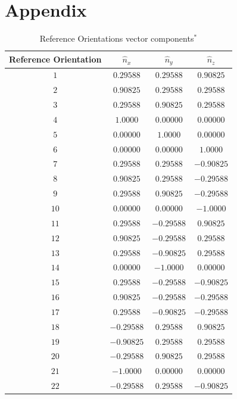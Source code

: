 \documentclass[preprint,3p]{elsarticle}
\begin{document}
 

\newpage

\section*{Appendix}
\label{Appendix 1}
\begin{table}[h]
	\begin{center}
		\caption{\label{tab:n} Reference Orientations vector components$^*$}
		\begin{tabular}{|c|c|c|c|}
			\hline\hline
			Reference Orientation & $\hat{n}_x$ &  $\hat{n}_y$ &  $\hat{n}_z$ \\
			\hline
			$1$ & $ 0.29588$ &  $ 0.29588$ & $ 0.90825$ \\
			$2$ & $ 0.90825$ &  $ 0.29588$ & $ 0.29588$ \\
			$3$ & $ 0.29588$ &  $ 0.90825$ & $ 0.29588$ \\
			$4$ & $1.0000$ &  $0.00000$ & $0.00000$ \\
			$5$ & $0.00000$ &  $1.0000$ & $0.00000$ \\
			$6$ & $0.00000$ &  $0.00000$ & $1.0000$ \\
			$7$ & $ 0.29588$ &  $ 0.29588$ & $-0.90825$ \\
			$8$ & $ 0.90825$ &  $ 0.29588$ & $-0.29588$ \\
			$9$ & $ 0.29588$ &  $ 0.90825$ & $-0.29588$ \\
			$10$ & $0.00000$ &  $0.00000$ & $-1.0000$ \\
			$11$ & $ 0.29588$ &  $-0.29588$ & $ 0.90825$ \\
			$12$ & $ 0.90825$ &  $-0.29588$ & $ 0.29588$ \\
			$13$ & $ 0.29588$ &  $-0.90825$ & $ 0.29588$ \\
			$14$ & $0.00000$ &  $-1.0000$ & $0.00000$ \\
			$15$ & $ 0.29588$ &  $-0.29588$ & $-0.90825$ \\
			$16$ & $ 0.90825$ &  $-0.29588$ & $-0.29588$ \\
			$17$ & $ 0.29588$ &  $-0.90825$ & $-0.29588$ \\
			$18$ & $-0.29588$ &  $ 0.29588$ & $ 0.90825$ \\
			$19$ & $-0.90825$ &  $ 0.29588$ & $ 0.29588$ \\
			$20$ & $-0.29588$ &  $ 0.90825$ & $ 0.29588$ \\
			$21$ & $-1.0000$ &  $0.00000$ & $0.00000$ \\
			$22$ & $-0.29588$ &  $ 0.29588$ & $-0.90825$ \\

\end{tabular}
\end{center}
\end{table}
\end{document}

